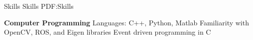 \documentclass[letterpaper,MMMyyyy,nonstopmode]{simpleresumecv}
\begin{document}
\begin{Body}











\Section
{Skills}
{Skills}
{PDF:Skills}

\Entry
{\textbf{Computer Programming}}
\Gap
\BulletItem
Languages: C++, Python, Matlab
\BulletItem
Familiarity with OpenCV, ROS, and Eigen libraries
\BulletItem
Event driven programming in C %



\end{Body}
\end{document}
